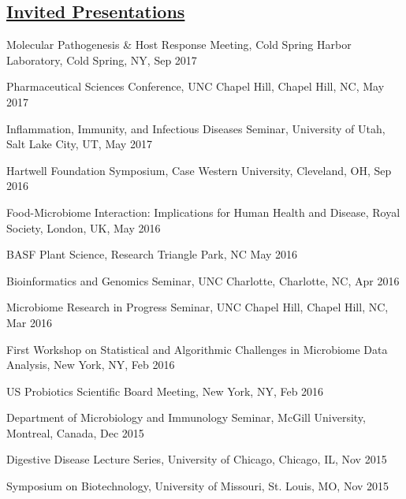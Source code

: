 \documentclass[overlapped,line,11pt]{res}
\begin{document}
\begin{resume}
\section{\underline{\sc Invited Presentations}}
\vspace{.25in}

\begin{revnumerate}[50]

\item {Molecular Pathogenesis \& Host Response Meeting, Cold Spring Harbor Laboratory, Cold Spring, NY, Sep 2017}

\item {Pharmaceutical Sciences Conference, UNC Chapel Hill, Chapel Hill, NC, May 2017}

\item {Inflammation, Immunity, and Infectious Diseases Seminar, University of Utah, Salt Lake City, UT, May 2017}

\item {Hartwell Foundation Symposium, Case Western University, Cleveland, OH, Sep 2016}

\item {Food-Microbiome Interaction: Implications for Human Health and Disease, Royal Society, London, UK, May 2016}

\item {BASF Plant Science, Research Triangle Park, NC May 2016}

\item {Bioinformatics and Genomics Seminar, UNC Charlotte, Charlotte, NC, Apr 2016}

\item {Microbiome Research in Progress Seminar, UNC Chapel Hill, Chapel Hill, NC, Mar 2016}

\item {First Workshop on Statistical and Algorithmic Challenges in Microbiome Data Analysis, New York, NY, Feb 2016}

\item {US Probiotics Scientific Board Meeting, New York, NY, Feb 2016}

\item {Department of Microbiology and Immunology Seminar, McGill University, Montreal, Canada, Dec 2015}

\item {Digestive Disease Lecture Series, University of Chicago, Chicago, IL, Nov 2015}

\item {Symposium on Biotechnology, University of Missouri, St. Louis, MO, Nov 2015}


\end{revnumerate}
\end{resume}
\end{document}
